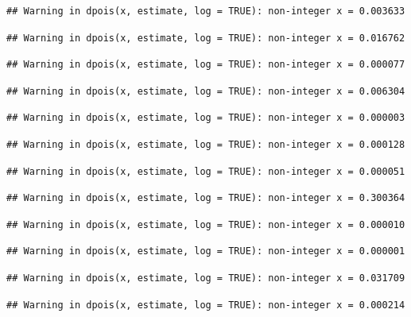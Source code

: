\documentclass[]{article}
\begin{document}
\begin{verbatim}
## Warning in dpois(x, estimate, log = TRUE): non-integer x = 0.003633
\end{verbatim}

\begin{verbatim}
## Warning in dpois(x, estimate, log = TRUE): non-integer x = 0.016762
\end{verbatim}

\begin{verbatim}
## Warning in dpois(x, estimate, log = TRUE): non-integer x = 0.000077
\end{verbatim}

\begin{verbatim}
## Warning in dpois(x, estimate, log = TRUE): non-integer x = 0.006304
\end{verbatim}

\begin{verbatim}
## Warning in dpois(x, estimate, log = TRUE): non-integer x = 0.000003
\end{verbatim}

\begin{verbatim}
## Warning in dpois(x, estimate, log = TRUE): non-integer x = 0.000128
\end{verbatim}

\begin{verbatim}
## Warning in dpois(x, estimate, log = TRUE): non-integer x = 0.000051
\end{verbatim}

\begin{verbatim}
## Warning in dpois(x, estimate, log = TRUE): non-integer x = 0.300364
\end{verbatim}

\begin{verbatim}
## Warning in dpois(x, estimate, log = TRUE): non-integer x = 0.000010
\end{verbatim}

\begin{verbatim}
## Warning in dpois(x, estimate, log = TRUE): non-integer x = 0.000001
\end{verbatim}

\begin{verbatim}
## Warning in dpois(x, estimate, log = TRUE): non-integer x = 0.031709
\end{verbatim}

\begin{verbatim}
## Warning in dpois(x, estimate, log = TRUE): non-integer x = 0.000214
\end{verbatim}
\end{document}
